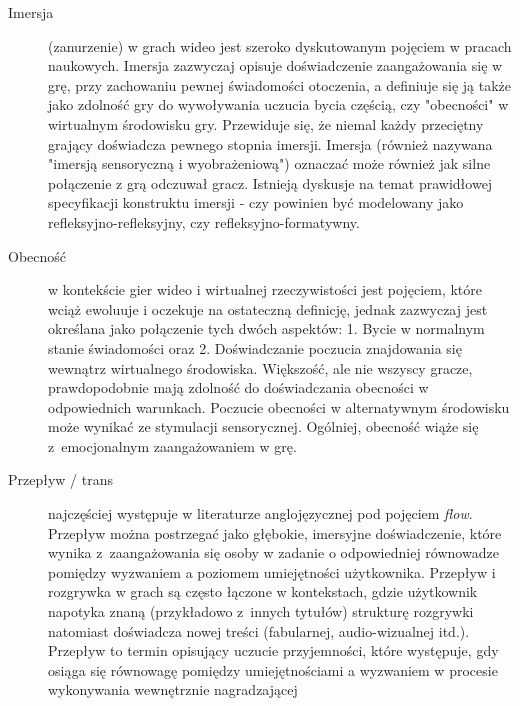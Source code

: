 \begin{description}
      \item[Imersja] (zanurzenie) w grach wideo jest szeroko dyskutowanym pojęciem w pracach
            naukowych. Imersja zazwyczaj opisuje doświadczenie zaangażowania się w grę, przy zachowaniu pewnej
            świadomości otoczenia, a definiuje się ją także jako zdolność gry do wywoływania uczucia bycia
            częścią, czy "obecności" w wirtualnym środowisku gry. Przewiduje się, że niemal każdy przeciętny grający
            doświadcza pewnego stopnia imersji\cite{development_of_game}. Imersja (również nazywana "imersją
            sensoryczną i wyobrażeniową") oznaczać może również jak silne połączenie z grą odczuwał gracz\cite{validation_of_ge_scales}.
            Istnieją dyskusje na temat prawidłowej specyfikacji konstruktu imersji - czy powinien być modelowany
            jako refleksyjno-refleksyjny, czy refleksyjno-formatywny\cite{eng_in_games}.
      \item[Obecność] w kontekście gier wideo i wirtualnej rzeczywistości jest pojęciem, które
            wciąż ewoluuje i oczekuje na ostateczną definicję, jednak zazwyczaj jest określana jako połączenie
            tych dwóch aspektów: 1. Bycie w normalnym stanie świadomości oraz 2. Doświadczanie poczucia znajdowania się
            wewnątrz wirtualnego środowiska\cite{development_of_game}. Większość, ale nie wszyscy gracze, prawdopodobnie mają zdolność do
            doświadczania obecności w odpowiednich warunkach\cite{development_of_game}. Poczucie obecności w
            alternatywnym środowisku może wynikać ze stymulacji sensorycznej\cite{measuring_narrative}.
            Ogólniej, obecność wiąże się z~emocjonalnym zaangażowaniem w grę\cite{validation_of_ge_scales}.
      \item[Przepływ / trans] najczęściej występuje w literaturze anglojęzycznej pod pojęciem \textit{flow}.
            Przepływ można postrzegać jako głębokie, imersyjne doświadczenie, które wynika z~zaangażowania się
            osoby w zadanie o odpowiedniej równowadze pomiędzy wyzwaniem a poziomem umiejętności użytkownika\cite{measuring_engagement}.
            Przepływ i rozgrywka w grach są często łączone w kontekstach, gdzie użytkownik napotyka znaną (przykładowo
            z~innych tytułów) strukturę rozgrywki natomiast doświadcza nowej treści (fabularnej,
            audio-wizualnej itd.)\cite{measuring_engagement}. Przepływ to termin opisujący uczucie przyjemności, które występuje, gdy osiąga
            się równowagę pomiędzy umiejętnościami a wyzwaniem w procesie wykonywania wewnętrznie nagradzającej

\end{description}
